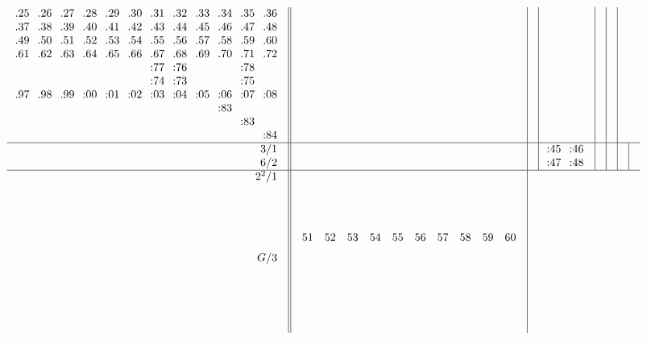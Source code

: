 \documentclass[12pt,a4paper]{amsart}
\begin{document}
\begin{align*}
\begin{array}{r||c|c|c|c|c|c|c}
\begin{array}{cccccccccccc}
\llap{.}25&\llap{.}26&\llap{.}27&\llap{.}28&\llap{.}29&\llap{.}30&\llap{.}31&\llap{.}32&\llap{.}33&\llap{.}34&\llap{.}35&\llap{.}36\\
\llap{.}37&\llap{.}38&\llap{.}39&\llap{.}40&\llap{.}41&\llap{.}42&\llap{.}43&\llap{.}44&\llap{.}45&\llap{.}46&\llap{.}47&\llap{.}48\\
\llap{.}49&\llap{.}50&\llap{.}51&\llap{.}52&\llap{.}53&\llap{.}54&\llap{.}55&\llap{.}56&\llap{.}57&\llap{.}58&\llap{.}59&\llap{.}60\\
\llap{.}61&\llap{.}62&\llap{.}63&\llap{.}64&\llap{.}65&\llap{.}66&\llap{.}67&\llap{.}68&\llap{.}69&\llap{.}70&\llap{.}71&\llap{.}72\\
&&&&&&\llap:77&\llap:76&&&\llap:78&\\
&&&&&&\llap:74&\llap:73&&&\llap:75&\\
\llap{.}97&\llap{.}98&\llap{.}99&\llap:00&\llap:01&\llap:02&\llap:03&\llap:04&\llap:05&\llap:06&\llap:07&\llap:08\\
&&&&&&&&&\llap:83&&\\
&&&&&&&&&&\llap:83&\\
&&&&&&&&&&&\llap:84\\
  \end{array}
&&&&&\\\hline
    \begin{array}{r}
      3/1 \\ 6/2
    \end{array}
&&&
    \begin{array}{cc}
      \llap:45&\llap:46\\
      \llap:47&\llap:48
    \end{array}
&&&&\\\hline
    \begin{array}{r}
      2^2/1 \\ \\ \\ \\ \\ \\ G/3 \\ \\ \\ \\ \\ \\
    \end{array}
&
  \begin{array}{cccccccccc}
51&52&53&54&55&56&57&58&59&60\\
\\
\\

\end{array}
\end{array}
\end{align*}
\end{document}
